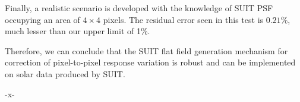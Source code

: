 \documentclass[11pt,a4paper]{article}
\begin{document}
		Finally, a realistic scenario is developed with the knowledge of SUIT PSF occupying an area of $4\times4$ pixels. The residual error seen in this test is $0.21\%$, much lesser than our upper limit of 1\%.
		
		Therefore, we can conclude that the SUIT flat field generation mechanism for correction of pixel-to-pixel response variation is robust and can be implemented on solar data produced by SUIT.


\begin{center}
	-x-
\end{center}
\end{document}

